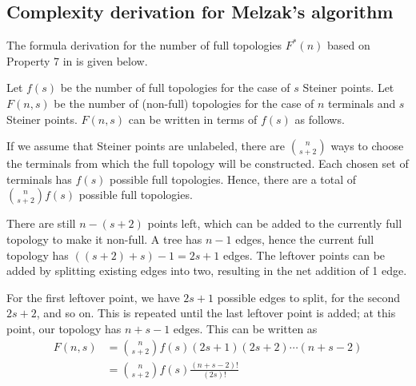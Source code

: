 \documentclass{l4proj}
\begin{document}
\begin{appendices}

    \chapter{Complexity derivation for Melzak's algorithm}
    \label{app:melzak_complexity}

    The formula derivation for the number of full topologies $F^*(n)$ based on Property 7 in \cite{Gilbert1968SteinerMT} is given below.

    Let $f(s)$ be the number of full topologies for the case of $s$ Steiner points.
    Let $F(n, s)$ be the number of (non-full) topologies for the case of $n$ terminals and $s$ Steiner points. $F(n, s)$ can be written in terms of $f(s)$ as follows.

    If we assume that Steiner points are unlabeled, there are $\binom{n}{s+2}$ ways to choose the terminals from which the full topology will be constructed. Each chosen set of terminals has $f(s)$ possible full topologies. Hence, there are a total of $\binom {n}{s+2}f(s)$ possible full topologies.

    There are still $n - (s + 2)$ points left, which can be added to the currently full topology to make it non-full. A tree has $n - 1$ edges, hence the current full topology has $((s + 2) + s) - 1 = 2s + 1$ edges. The leftover points can be added by splitting existing edges into two, resulting in the net addition of 1 edge.

    For the first leftover point, we have $2s + 1$ possible edges to split, for the second $2s + 2$, and so on. This is repeated until the last leftover point is added; at this point, our topology has $n + s - 1$ edges. This can be written as
    \begin{equation*}
        \begin{aligned}
            F(n, s) & = \binom{n}{s+2}f(s)(2s + 1)(2s + 2)\cdots(n + s - 2) \\
                    & = \binom{n}{s+2}f(s)\frac{(n + s - 2)!}{(2s)!}
        \end{aligned}
    \end{equation*}


\end{appendices}
\end{document}
